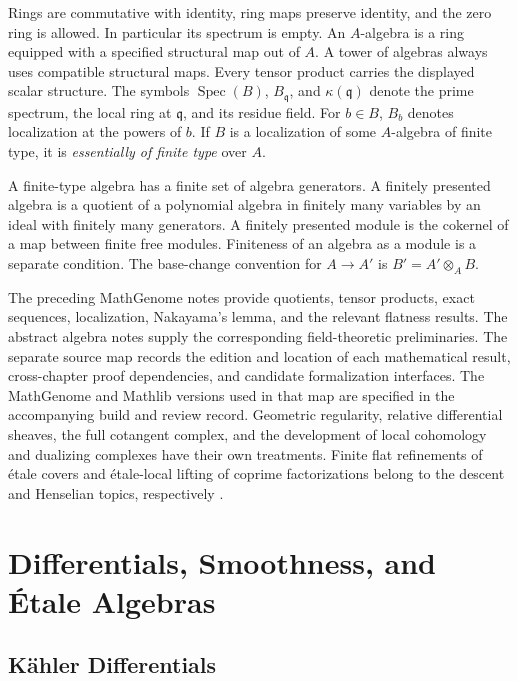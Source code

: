 \documentclass[11pt,oneside,openany]{book}
\theoremstyle{definition}
\theoremstyle{remark}
\begin{document}
Rings are commutative with identity, ring maps preserve identity, and the zero
ring is allowed. In particular its spectrum is empty. An $A$-algebra is a ring
equipped with a specified structural map out of $A$. A tower of algebras
always uses compatible structural maps. Every tensor product carries the
displayed scalar structure. The symbols $\operatorname{Spec}(B)$,
$B_{\mathfrak q}$, and $\kappa(\mathfrak q)$ denote the prime spectrum, the
local ring at $\mathfrak q$, and its residue field. For $b\in B$, $B_b$
denotes localization at the powers of $b$. If $B$ is a localization of some
$A$-algebra of finite type, it is \emph{essentially of finite type} over $A$.

A finite-type algebra has a finite set of algebra generators. A finitely
presented algebra is a quotient of a polynomial algebra in finitely many
variables by an ideal with finitely many generators. A finitely presented
module is the cokernel of a map between finite free modules. Finiteness of
an algebra as a module is a separate condition. The base-change convention
for $A\to A'$ is $B'=A'\otimes_A B$.

The preceding MathGenome notes \cite{p103} provide quotients, tensor products,
exact sequences, localization, Nakayama's lemma, and the relevant flatness
results. The abstract algebra notes \cite{d07} supply the corresponding
field-theoretic preliminaries. The separate source map records the edition
and location of each mathematical result, cross-chapter proof dependencies,
and candidate formalization interfaces. The MathGenome and Mathlib versions
used in that map are specified in the accompanying build and review record.
Geometric regularity, relative differential sheaves, the full cotangent
complex, and the development of local cohomology and dualizing complexes
have their own treatments. Finite flat refinements of \'{e}tale covers
and \'{e}tale-local lifting of coprime factorizations belong to the
descent and Henselian topics, respectively \cite[Tags 00UF--00UH]{stacks}.

\mainmatter
\part{Differentials, Smoothness, and \'{E}tale Algebras}
\label{part:differentials}
\chapter{K\"ahler Differentials}\label{ch:differentials}
\end{document}
